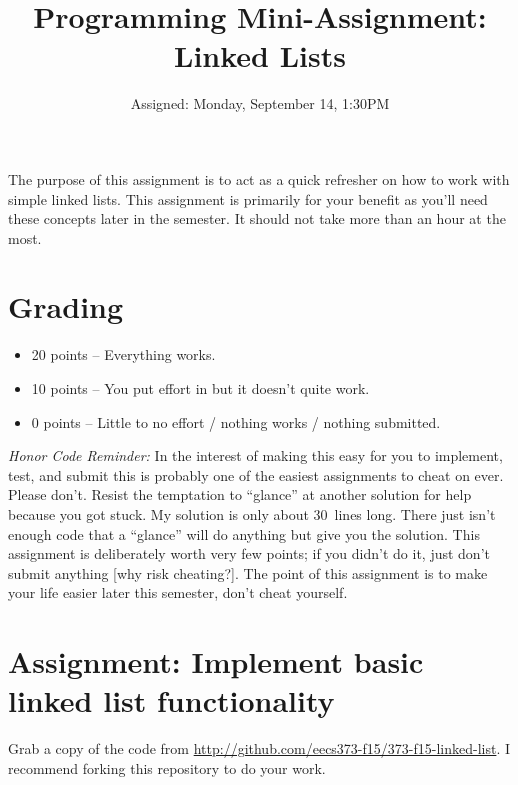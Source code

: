 \documentclass{article}
\begin{document}
\pagestyle{fancyplain}


\title{\textbf{Programming Mini-Assignment: Linked Lists}}
\author{Assigned: Monday, September 14, 1:30PM}
\date{\textbf{\color{red}{Due: Monday, September 21, 1:30PM (Hard Deadline)}}}
\maketitle

The purpose of this assignment is to act as a quick refresher on how to work
with simple linked lists. This assignment is primarily for your benefit as
you'll need these concepts later in the semester. It should not take more than
an hour at the most.


\section*{Grading}

\begin{itemize}
  \item 20 points -- Everything works.
  \item 10 points -- You put effort in but it doesn't quite work.
  \item 0 points -- Little to no effort / nothing works / nothing submitted.
\end{itemize}

\noindent
\textit{Honor Code Reminder:} In the interest of making this easy for you to
implement, test, and submit this is probably one of the easiest assignments to
cheat on ever. Please don't. Resist the temptation to ``glance'' at another
solution for help because you got stuck. My solution is only about 30~lines
long. There just isn't enough code that a ``glance'' will do anything but give
you the solution. This assignment is deliberately worth very few points; if
you didn't do it, just don't submit anything [why risk cheating?]. The point
of this assignment is to make your life easier later this semester, don't
cheat yourself.


\section*{Assignment: Implement basic linked list functionality}

Grab a copy of the code from
\url{http://github.com/eecs373-f15/373-f15-linked-list}. I recommend forking
this repository to do your work.
\end{document}
